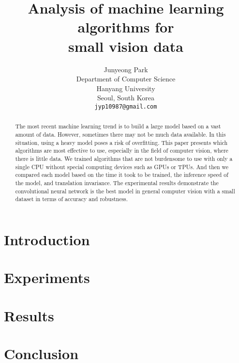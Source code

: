 \documentclass{article}
\title{Analysis of machine learning algorithms for \\small vision data}
\author{Junyeong Park\\
		Department of Computer Science\\
		Hanyang University\\
		Seoul, South Korea\\
		\texttt{jyp10987@gmail.com}}
\date{}
\begin{document}
\maketitle

\begin{abstract}

The most recent machine learning trend is to build a large model based on a vast amount of data.
However, sometimes there may not be much data available.
In this situation, using a heavy model poses a risk of overfitting.
This paper presents which algorithms are most effective to use, especially in the field of computer vision, where there is little data.
We trained algorithms that are not burdensome to use with only a single CPU without special computing devices such as GPUs or TPUs.
And then we compared each model based on the time it took to be trained, the inference speed of the model, and translation invariance.
The experimental results demonstrate the convolutional neural network is the best model in general computer vision with a small dataset in terms of accuracy and robustness.

\end{abstract}

\section{Introduction}


\section{Experiments}


\section{Results}


\section{Conclusion}

\end{document}
